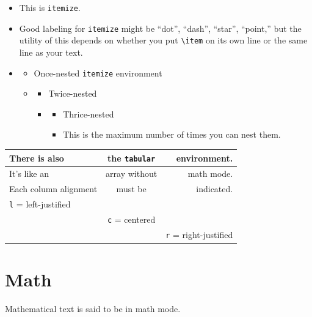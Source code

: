 \documentclass{article} 		%
\begin{document}
\begin{itemize}
	\item
	This is \texttt{itemize}. 
	\item%
	Good labeling for \texttt{itemize} might be ``dot'', ``dash'', ``star'', ``point,'' but the utility of this depends on whether you put \verb$\item$ on its own line or the same line as your text. 
	
	\item%
	\begin{itemize}
		\item%
		Once-nested \texttt{itemize} environment 
		
		\item%
			\begin{itemize}
				\item%
				Twice-nested
				
				\item%
				\begin{itemize}
					\item %
					Thrice-nested
					
					\item%
					This is the maximum number of times you can nest them. 
					
				\end{itemize}
			\end{itemize}
	\end{itemize}
\end{itemize}

\begin{tabular}{|l||c||r|}
	\hline
	There is also & the \texttt{tabular} & environment. \\ \hline\hline
	It's like an & array without & math mode. \\ \hline
	Each column alignment & must be & indicated. \\ \hline
	\texttt{l} = left-justified & & \\ \hline
	& \texttt{c} = centered & \\ \hline
	& & \texttt{r} = right-justified \\ \hline
\end{tabular}

\newpage
\section{Math} \label{sec:math}
Mathematical text is said to be in math mode. 
\end{document}

